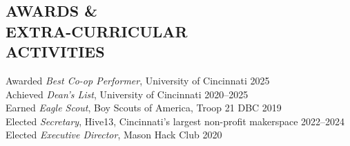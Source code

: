 \documentclass[margin]{res} %
\begin{document}
\begin{resume}
\section{AWARDS \& \\EXTRA-CURRICULAR \\ ACTIVITIES} 

Awarded {\it Best Co-op Performer}, University of Cincinnati \hfill 2025 \\
Achieved {\it Dean's List}, University of Cincinnati \hfill 2020--2025 \\
Earned {\it Eagle Scout}, Boy Scouts of America, Troop 21 DBC \hfill 2019 \\
Elected {\it Secretary}, Hive13, Cincinnati's largest non-profit makerspace \hfill 2022--2024\\
Elected {\it Executive Director}, Mason Hack Club \hfill 2020\\


\end{resume}
\end{document}
